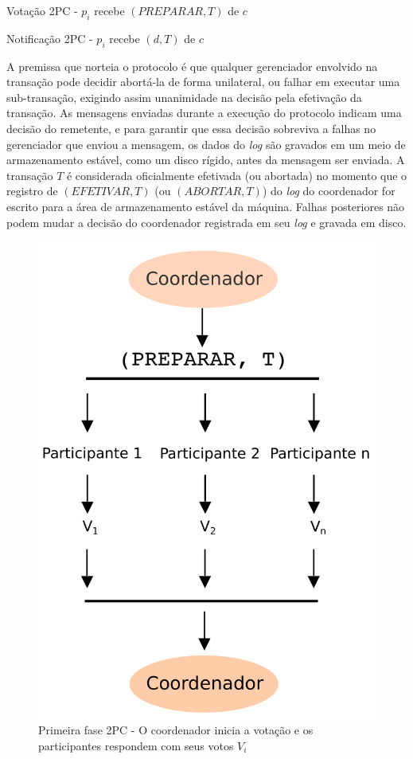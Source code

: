 \documentclass[11pt,twoside,a4paper]{book}
\begin{document}
\begin{algorithm}
\caption{Votação 2PC - $p_i$ recebe $(PREPARAR, T)$ de $c$}
\label{alg:2pc_participante1}
\end{algorithm}

\begin{algorithm}
\caption{Notificação 2PC - $p_i$ recebe $(d, T)$ de $c$}
\label{alg:2pc_participante2}
\end{algorithm}

A premissa que norteia o protocolo é que qualquer gerenciador envolvido na transação pode decidir abortá-la de forma unilateral, ou falhar em executar uma sub-transação, exigindo assim unanimidade na decisão pela efetivação da transação. As mensagens enviadas durante a execução do protocolo indicam uma decisão do remetente, e para garantir que essa decisão sobreviva a falhas no gerenciador que enviou a mensagem, os dados do \emph{log} são gravados em um meio de armazenamento estável, como um disco rígido, antes da  mensagem ser enviada. A transação $T$ é considerada oficialmente efetivada (ou abortada) no momento que o registro de $(EFETIVAR, T)$ (ou $(ABORTAR, T)$) do \emph{log} do coordenador for escrito para a área de armazenamento estável da máquina. Falhas posteriores não podem mudar a decisão do coordenador registrada em seu \emph{log} e gravada em disco.

\begin{figure}
  \centering
  \includegraphics[width=.40\textwidth]{2PC_1fase} 
  \caption{Primeira fase 2PC - O coordenador inicia a votação e os participantes respondem com seus votos $V_i$}
  \label{fig:2PC_1fase} 
\end{figure}
\end{document}
